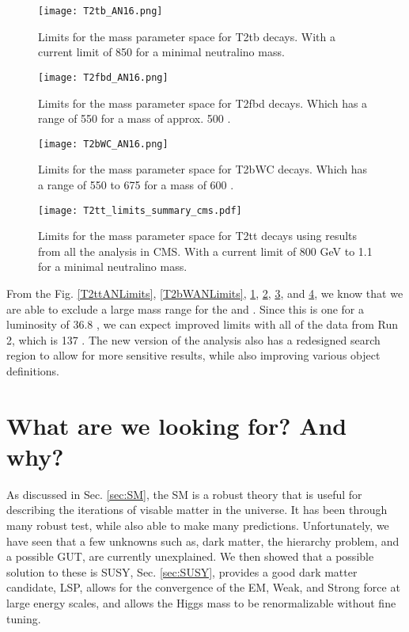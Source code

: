 \begin{figure}
\centering
	\texttt{[image: T2tb\_AN16.png]}
 	\caption[T2tb Limits]{Limits for the mass parameter space for T2tb decays. With a current limit of 850 \GeV{} for a minimal neutralino mass.}
 	\label{T2tbANLimits} 
\end{figure}

\begin{figure}
\centering
	\texttt{[image: T2fbd\_AN16.png]}
 	\caption[T2fbd Limits]{Limits for the mass parameter space for T2fbd decays. Which has a range of 550 \GeV{} for a \neutralino{} mass of approx. 500 \GeV.}
 	\label{T2fbdANLimits} 
\end{figure}

\begin{figure}
\centering
	\texttt{[image: T2bWC\_AN16.png]}
 	\caption[T2bWC Limits]{Limits for the mass parameter space for T2bWC decays. Which has a range of 550 to 675 \GeV{} for a \neutralino{} mass of 600 \GeV.}
 	\label{T2bWCANLimits} 
\end{figure}

\begin{figure}
\centering
	\texttt{[image: T2tt\_limits\_summary\_cms.pdf]}
 	\caption[T2tt Limits for all decay modes]{Limits for the mass parameter space for T2tt decays using results from all the analysis in CMS. With a current limit of 800 GeV to 1.1 \TeV{} for a minimal neutralino mass.}
 	\label{T2ttCMSAll} 
\end{figure}

From the Fig. \ref{T2ttANLimits}, \ref{T2bWANLimits}, \ref{T2tbANLimits}, \ref{T2fbdANLimits}, \ref{T2bWCANLimits}, and \ref{T2ttCMSAll}, we know that we are able to exclude a large mass range for the \st{} and \neutralino{}. Since this is one for a luminosity of 36.8 \fb, we can expect improved limits with all of the data from Run 2, which is 137 \fb. The new version of the analysis also has a redesigned search region to allow for more sensitive results, while also improving various object definitions.

\section{What are we looking for? And why?}
As discussed in Sec. \ref{sec:SM}, the SM is a robust theory that is useful for describing the iterations of visable matter in the universe. It has been through many robust test, while also able to make many predictions. Unfortunately, we have seen that a few unknowns such as, dark matter, the hierarchy problem, and a possible GUT, are currently unexplained. We then showed that a possible solution to these is SUSY, Sec. \ref{sec:SUSY}, provides a good dark matter candidate, LSP, allows for the convergence of the EM, Weak, and Strong force at large energy scales, and allows the Higgs mass to be renormalizable without fine tuning. 

